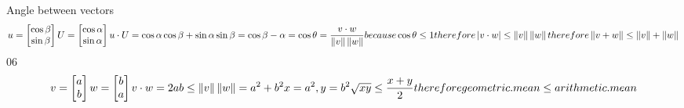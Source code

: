 \documentclass{article}
\begin{document}
Angle between vectors
\begin{equation}
u=\begin{bmatrix}
\cos \beta \\ 
\sin \beta
\end{bmatrix}
\\ U=\begin{bmatrix}
\cos \alpha  \\ 
\sin \alpha
\end{bmatrix}
\\ u\cdot U = \cos \alpha \cos \beta + \sin \alpha \sin \beta = \cos {\beta - \alpha} = \cos \theta = \frac {v\cdot w}{\left \| v \right \|\left \| w \right \|}
\\ because \cos \theta \leq 1
\\ therefore \left | v \cdot w \right | \leq \left \| v \right \| \left \| w \right \|
\\ therefore \left \| v+w \right \| \leq \left \| v \right \| + \left \| w \right \|
\end{equation}
06
\begin{equation}
v=\begin{bmatrix}
a\\ 
b
\end{bmatrix}
w=\begin{bmatrix}
b\\ 
a
\end{bmatrix}
\\ v\cdot w = 2ab \leq \left \| v \right \| \left \| w \right \| = a^2 + b^2
\\ x = a^2, y = b^2
\\ \sqrt {xy} \leq \frac {x+y}2
\\ therefore geometric.mean \leq arithmetic.mean
\end{equation}
\end{document}
